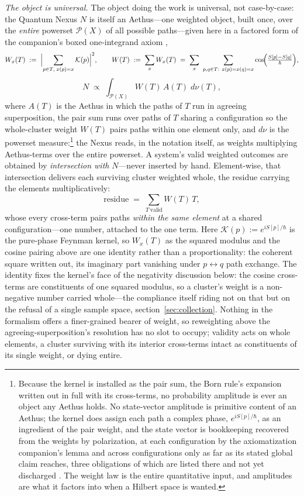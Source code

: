 \documentclass[11pt]{article}
\theoremstyle{definition}
\newcommand{\Aethus}{Aethus}
\begin{document}
\textit{The object is universal.} The object doing the work is universal, not case-by-case: the Quantum Nexus $N$ is itself an Aethus---one weighted object, built once, over the \emph{entire} powerset $\mathcal{P}(X)$ of all possible paths---given here in a factored form of the companion's boxed one-integrand axiom \cite{Aethus},
\[
W_x(T) \;:=\; \Bigl|\sum_{p \in T,\; x(p) = x} \mathcal{K}(p)\Bigr|^{2}, \qquad
W(T) \;:=\; \sum_{x} W_x(T) \;=\; \sum_{x}\ \sum_{p,q \in T:\ x(p)=x(q)=x} \cos\!\Bigl(\tfrac{S[p] - S[q]}{\hbar}\Bigr),
\]
\[
N \;\propto\; \int_{\mathcal{P}(X)} W(T)\, A(T)\; d\nu(T),
\]
where $A(T)$ is the Aethus in which the paths of $T$ run in agreeing superposition, the pair sum runs over paths of $T$ sharing a configuration so the whole-cluster weight $W(T)$ pairs paths within one element only, and $d\nu$ is the powerset measure:\footnote{Because the kernel is installed as the pair sum, the Born rule's expansion written out in full with its cross-terms, no probability amplitude is ever an object any \Aethus{} holds. No state-vector amplitude is primitive content of an \Aethus{}; the kernel does assign each path a complex phase, $e^{iS[p]/\hbar}$, as an ingredient of the pair weight, and the state vector is bookkeeping recovered from the weights by polarization, at each configuration by the axiomatization companion's lemma and across configurations only as far as its stated global claim reaches, three obligations of which are listed there and not yet discharged \cite{AethusQuant}. The weight law is the entire quantitative input, and amplitudes are what it factors into when a Hilbert space is wanted.} the Nexus reads, in the notation itself, as weights multiplying Aethus-terms over the entire powerset. A system's valid weighted outcomes are obtained by \emph{intersection with} $N$---never inserted by hand. Element-wise, that intersection delivers each surviving cluster weighted whole, the residue carrying the elements multiplicatively:
\[
\text{residue} \;=\; \sum_{T\ \text{valid}} W(T)\, T,
\]
whose every cross-term pairs paths \emph{within the same element} at a shared configuration---one number, attached to the one term. Here $\mathcal{K}(p) := e^{iS[p]/\hbar}$ is the pure-phase Feynman kernel, so $W_x(T)$ as the squared modulus and the cosine pairing above are one identity rather than a proportionality: the coherent square written out, its imaginary part vanishing under $p \leftrightarrow q$ path exchange. The identity fixes the kernel's face of the negativity discussion below: the cosine cross-terms are constituents of one squared modulus, so a cluster's weight is a non-negative number carried whole---the compliance itself riding not on that but on the refusal of a single sample space, section~\ref{sec:collection}. Nothing in the formalism offers a finer-grained bearer of weight, so reweighting above the agreeing-superposition's resolution has no slot to occupy; validity acts on whole elements, a cluster surviving with its interior cross-terms intact as constituents of its single weight, or dying entire.
\end{document}

